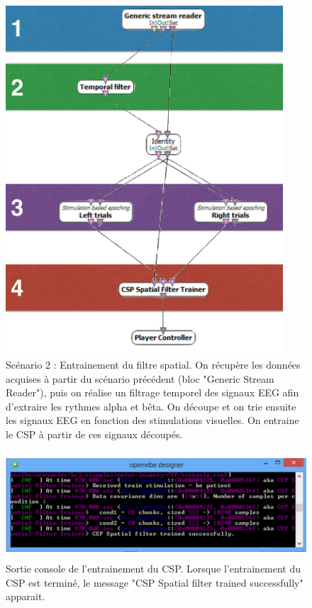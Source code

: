 \begin{figure}[h]
	\centering\includegraphics[height=13cm]{images/scenario2.png}
	\caption[Scénario 2 : Entrainement du filtre spatial]{Scénario 2 : Entrainement du filtre spatial. On récupère les données acquises à partir du scénario précédent (bloc "Generic Stream Reader"), puis on réalise un filtrage temporel des signaux EEG afin d'extraire les rythmes alpha et bêta. On découpe et on trie ensuite les signaux EEG en fonction des stimulations visuelles. On entraine le CSP à partir de ces signaux découpés.}
	\label{scena2}
\end{figure}

\begin{figure}[h]
	\centering\includegraphics[height=4cm]{images/consoleCSP.png}
	\caption[Sortie console de l'entrainement du CSP]{Sortie console de l'entrainement du CSP. Lorsque l'entrainement du CSP est terminé, le message "CSP Spatial filter trained successfully" apparait.}
	\label{consoleCSP}
\end{figure}





